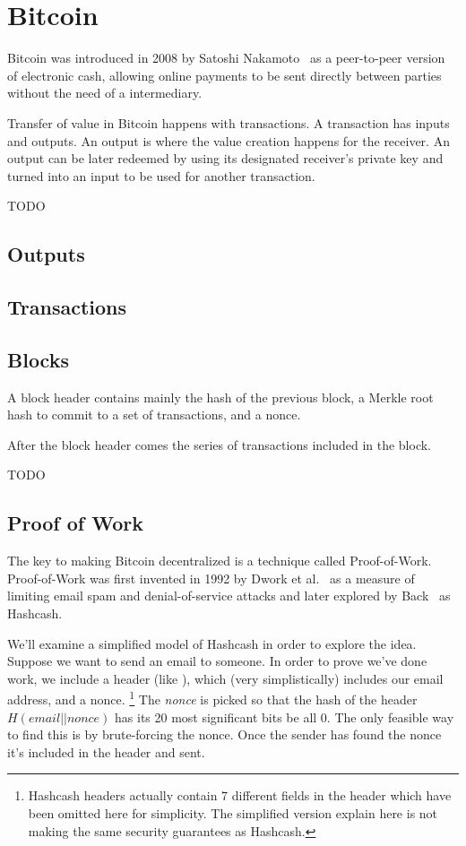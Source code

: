 \section{Bitcoin}
Bitcoin was introduced in 2008 by Satoshi Nakamoto~\cite{bitcoin} as a
peer-to-peer version of electronic cash, allowing online payments to be sent
directly between parties without the need of a intermediary.

Transfer of value in Bitcoin happens with transactions. A transaction has
inputs and outputs. An output is where the value creation happens for the
receiver. An output can be later redeemed by using its designated receiver's
private key and turned into an input to be used for another transaction.

TODO

\subsection{Outputs}
\subsection{Transactions}
\subsection{Blocks}
A block header contains mainly the hash of the previous block, a Merkle root
hash to commit to a set of transactions, and a nonce.

After the block header comes the series of transactions included in the block.

TODO

\subsection{Proof of Work}
The key to making Bitcoin decentralized is a technique called Proof-of-Work. Proof-of-Work was first invented in 1992 by Dwork et al.~\cite{dwork} as a measure of limiting email spam and denial-of-service attacks and later explored by Back~\cite{hashcash} as Hashcash.

We'll examine a simplified model of Hashcash in order to explore the idea. Suppose we want to send an email to someone. In order to prove we've done work, we include a header (like ), which (very simplistically) includes our email address, and a nonce.
\footnote{Hashcash headers actually contain 7 different fields in the header which have been omitted here for simplicity. The simplified version explain here is not making the same security guarantees as Hashcash.}
The \emph{nonce} is picked so that the hash of the header $H(email || nonce)$ has its 20 most significant bits be all 0. The only feasible way to find this is by brute-forcing the nonce. Once the sender has found the nonce it's included in the header and sent.

